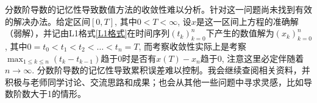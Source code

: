 分数阶导数的记忆性导致数值方法的收敛性难以分析。针对这一问题尚未找到有效的解决办法。给定区间$[0,T]$, 其中$0<T<\infty$, 设$x$是这一区间上方程的准确解（弱解），并记由L1格式\eqref{L1格式}在时间序列$\left(t_k\right)_{k=0}^n$下产生的数值解为$\left(x_k\right)_{k=0}^n$, 其中$0=t_0<t_1<t_2<\dots<t_n=T$, 而考察收敛性实际上是考察$\max_{1\leqslant k\leqslant n} \left(t_k-t_{k-1}\right)$趋于0时是否有$x(T)-x_n$趋于0, 注意这里必定伴随着$n\to \infty$. 分数阶导数的记忆性导致累积误差难以控制。我会继续查阅相关资料，并积极与老师同学讨论、交流思路和成果；也会从其他一些问题中寻求灵感，比如导数阶数大于1的情形。